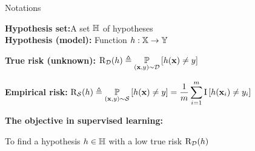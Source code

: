 \documentclass{slides}
\begin{document}

\begin{xframe}{Notations}

\begin{minipage}{0.49\linewidth}
{\bf Hypothesis set:}\hspace{1cm}A set $\mathbb{H}$ of hypotheses\\
{\bf Hypothesis (model):} Function $\textcolor{black}{h}: \mathbb{X}\to \mathbb{Y}$
\end{minipage}
\hfill
\begin{minipage}{0.5\linewidth}

\end{minipage}

\vspace{0.5cm}

{\bf True risk (unknown):}\hspace{1.35cm} $\displaystyle \text{R}_{\mathcal{D}}(\textcolor{black}{h}) \triangleq \operatorname*{\mathbb{P}}_{(\mathbf{x}, y)\sim\mathcal{D}}\left[ \textcolor{black}{h}(\mathbf{x})\ne y\right]$

\vspace{0.3cm}

{\bf Empirical risk:}\hspace{0.55cm} $\displaystyle \text{R}_{\mathcal{S}}(\textcolor{black}{h}) \triangleq \operatorname*{\mathbb{P}}_{(\mathbf{x}, y)\sim\mathcal{S}}\left[ \textcolor{black}{h}(\mathbf{x})\ne y\right] = \frac1{m}\sum_{i=1}^{m}\operatorname{I}\left[ \textcolor{black}{h}(\mathbf{x}_i)\ne y_i\right]$

\vspace{0.5cm}

{\bf The objective in supervised learning:}
\begin{center}
    To find a hypothesis $\textcolor{black}{h}\in\mathbb{H}$ with a low true risk $\text{R}_{\mathcal{D}}(\textcolor{black}{h})$\\
\end{center}

\end{xframe}

\end{document}
